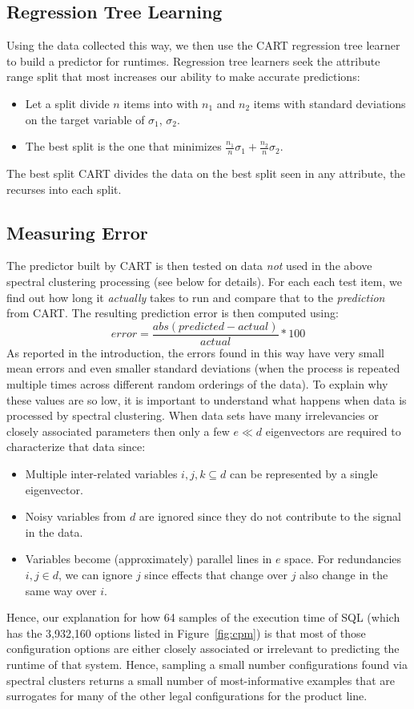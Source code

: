 \documentclass{sig-alternative}
\newcommand{\bi}{\begin{itemize}}%
\newcommand{\ei}{\end{itemize}}
\newcommand{\fig}[1]{Figure~\ref{fig:#1}}
\begin{document}
\subsection{Regression Tree Learning}
Using the data collected this way, we then use the CART regression tree learner \cite{breiman1984} to build a predictor for runtimes. Regression tree learners seek the attribute range split that most increases
our ability to make accurate predictions:
\bi
\item Let a split divide $n$ items  into   with $n_1$ and $n_2$ items
with standard deviations on the target variable of $\sigma_1$, $\sigma_2$.
\item The best split is the one that minimizes $\frac{n_1}{n}\sigma_1 + \frac{n_2}{n}\sigma_2$.
\ei
The best split CART divides the data on the best split seen in any attribute, the recurses into each split.
\subsection{Measuring Error}

The predictor built by CART  is then tested on data {\em not} used in the above spectral clustering processing (see below for details). For each each test item, we find out how long it {\em actually} takes to run and compare that
to the {\em prediction} from CART. The resulting prediction error is then computed using:
\begin{equation}\label{eq:err}
\mathit{error}=\frac{\mathit{abs}(\mathit{predicted} - \mathit{actual})}{\mathit{actual}}*100
\end{equation}
As reported in the introduction, the errors found in this way have very small mean errors   and even
smaller standard deviations (when the process is repeated multiple times across different random orderings of the data). To explain why these values are so low, it is important to understand what happens when data is processed by spectral
clustering.
When  data sets have many irrelevancies   or closely associated parameters then
only a few $e \ll d$ eigenvectors are required to characterize that data
since:
\bi
\item
Multiple inter-related variables $i,j,k \subseteq d$ can be represented
by a single  eigenvector.
\item
Noisy variables from $d$ are
ignored since they  do not contribute to the signal in the data.
\item
Variables  become (approximately) parallel lines
in $e$ space. For  redundancies \mbox{$i,j \in d$}, we
can ignore $j$
since effects that change over $j$ also
change in the same way over $i$.
\ei
Hence, our explanation for how 64 samples of the execution time of SQL (which has the
3,932,160 options listed in \fig{cpm}) is that most of those configuration options are either
closely associated or irrelevant to predicting the runtime of that system.
Hence, sampling a small number  configurations found via  spectral clusters returns
a  small number of most-informative examples that are surrogates
for many of the other legal configurations for the product line. 
\end{document}
